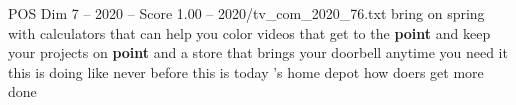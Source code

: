 \begin{textsample}{POS Dim 7 – 2020 – Score 1.00 – 2020/tv\_com\_2020\_76.txt}  \label{ex:f7_pos_089}
bring on spring with calculators that can help you color videos that get to the \textbf{point} and keep your projects on \textbf{point} and a store that brings your doorbell anytime you need it this is doing like never before this is today 's home depot how doers get more done

\end{textsample}
